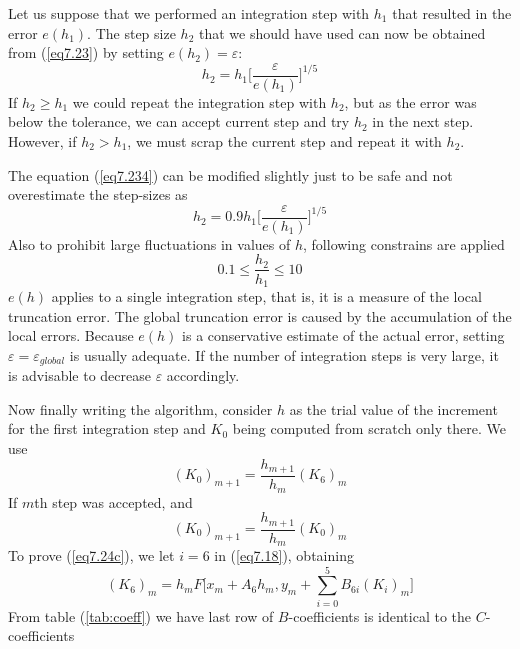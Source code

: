 \documentclass[12pt]{article}
\begin{document}
Let us suppose that we performed an integration step with $h_1$ that resulted in the
error $e(h_1)$. The step size $h_2$ that we should have used can now be obtained from (\ref{eq7.23}) by setting $e(h_2) = \varepsilon$:
\begin{equation}
\label{eq7.234}
    h_2 = h_1 \Bigg[ \dfrac{\varepsilon}{e(h_1)} \Bigg]^{1/5}
\end{equation}
If $h_2 \geq h_1$ we could repeat the integration step with $h_2$, but as the error was
below the tolerance, we can accept current step and try $h_2$ in the next step. However, if $h_2 > h_1$, we must scrap the current step and repeat it with $h_2$.
\par
The equation (\ref{eq7.234}) can be modified slightly just to be safe and not overestimate the step-sizes as
\begin{equation}
\label{eq7.24}
    h_2 = 0.9 h_1 \Bigg[ \dfrac{\varepsilon}{e(h_1)} \Bigg]^{1/5}
\end{equation}
Also to prohibit large fluctuations in values of $h$, following constrains are applied
\begin{equation}
    0.1 \leq \dfrac{h_2}{h_1} \leq 10
\end{equation}
$e(h)$ applies to a single integration step, that is, it is a measure of the local truncation error. The global truncation error is caused by the accumulation of the local errors. Because $e(h)$ is a conservative estimate of the actual error, setting $\varepsilon = \varepsilon_{global}$ is
usually adequate. If the number of integration steps is very large, it is advisable to
decrease $\varepsilon$ accordingly.
\par
Now finally writing the algorithm, consider $h$ as the trial value of the increment for the first integration step and $K_0$ being computed from scratch only there. We use
\begin{equation}
\label{eq7.24c}
    (K_0)_{m+1} = \dfrac{h_{m+1}}{h_m} (K_6)_m
\end{equation}
 If $m$th step was accepted, and
\begin{equation}
\label{eq7.24d}
    (K_0)_{m+1} = \dfrac{h_{m+1}}{h_m} (K_0)_m
\end{equation}
To prove (\ref{eq7.24c}), we let $i = 6$ in (\ref{eq7.18}), obtaining
\begin{equation}
    (K_6)_m = h_m F \Bigg[ x_m + A_6 h_m, y_m + \sum_{i=0}^5 B_{6i} (K_i)_m \Bigg]
\end{equation}
From table (\ref{tab:coeff}) we have last row of $B$-coefficients is identical to the $C$-coefficients
\end{document}
